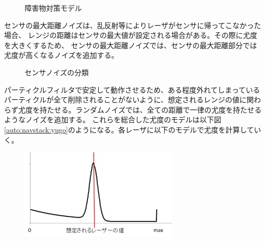 \begin{enumerate}
\begin{figure}[h]
\begin{center}
        \caption{障害物対策モデル}
        \label{auto:navstack:shogai}
      \end{center}
    \end{figure}
    センサの最大距離ノイズは、乱反射等によりレーザがセンサに帰ってこなかった場合、
    レンジの距離はセンサの最大値が設定される場合がある。その際に尤度を大きくするため、
    センサの最大距離ノイズでは、センサの最大距離部分では尤度が高くなるノイズを追加する。
    \begin{figure}[h]
      \begin{center}
        \caption{センサノイズの分類}
        \label{auto:navstack:noise}
      \end{center}
    \end{figure}
    パーティクルフィルタで安定して動作させるため、ある程度外れてしまっているパーティクルが全て削除されることがないように、想定されるレンジの値に関わらず尤度を持たせる。ランダムノイズでは、全ての距離で一律の尤度を持たせるようなノイズを追加する。
    これらを総合した尤度のモデルは以下図\ref{auto:navstack:yugo}のようになる。各レーザに以下のモデルで尤度を計算していく。
    \begin{figure}[h]
      \begin{center}
        \includegraphics[width=.6\linewidth]{img/auto_22.jpg}

\end{center}
\end{figure}
\end{enumerate}

